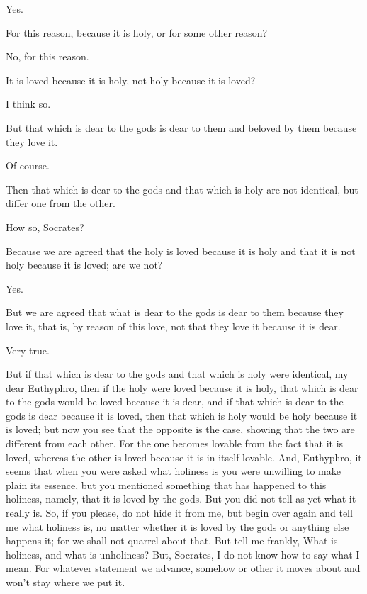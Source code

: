 \documentclass[letterpaper,12pt]{article}
\newcommand{\stephpag}[1]{\marginnote{\small\itshape\fontfamily{ppl}\selectfont #1}}
\begin{document}
\begin{drama}
\euthyphrospeaks
Yes.

\socratesspeaks
For this reason, because it is holy, or for some other reason?

\euthyphrospeaks
No, for this reason.

\socratesspeaks
It is loved because it is holy, not holy because it is loved?

\euthyphrospeaks
I think so.

\socratesspeaks
But that which is dear to the gods is dear to them and beloved by them because they love it. \stephpag{e}

\euthyphrospeaks
Of course.

\socratesspeaks
Then that which is dear to the gods and that which is holy are not identical, but differ one from the other.

\euthyphrospeaks
How so, Socrates?

\socratesspeaks
Because we are agreed that the holy is loved because it is holy and that it is not holy because it is loved; are we not?

\euthyphrospeaks
Yes.

\socratesspeaks
But we are agreed that what is dear to the gods is dear to them because they love it, that is, by reason of this love, not that they love it because it is dear.

\euthyphrospeaks
Very true.

\socratesspeaks
But if that which is dear to the gods and that which is holy were identical, my dear Euthyphro, then if the holy \stephpag{11 a} were loved because it is holy, that which is dear to the gods would be loved because it is dear, and if that which is dear to the gods is dear because it is loved, then that which is holy would be holy because it is loved; but now you see that the opposite is the case, showing that the two are different from each other. For the one becomes lovable from the fact that it is loved, whereas the other is loved because it is in itself lovable. And, Euthyphro, it seems that when you were asked what holiness is you were unwilling to make plain its essence, but you mentioned something that has happened to this holiness, namely, \stephpag{b} that it is loved by the gods. But you did not tell as yet what it really is. So, if you please, do not hide it from me, but begin over again and tell me what holiness is, no matter whether it is loved by the gods or anything else happens it; for we shall not quarrel about that. But tell me frankly, What is holiness, and what is unholiness?
\clearpage
\euthyphrospeaks
But, Socrates, I do not know how to say what I mean. For whatever statement we advance, somehow or other it moves about and won't stay where we put it.


\end{drama}
\end{document}
